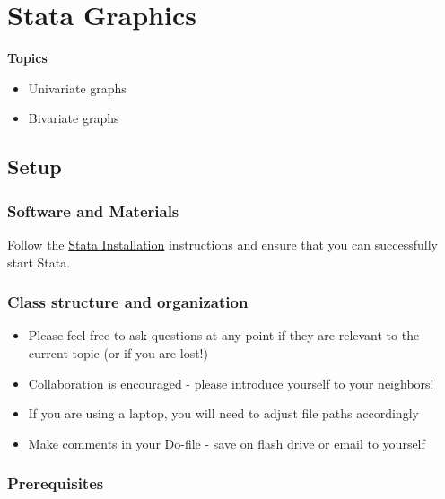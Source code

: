 \documentclass[
]{book}
\providecommand{\tightlist}{%
  \setlength{\itemsep}{0pt}\setlength{\parskip}{0pt}}
\begin{document}
\hypertarget{stata-graphics}{%
\chapter{Stata Graphics}\label{stata-graphics}}

\textbf{Topics}

\begin{itemize}
\tightlist
\item
  Univariate graphs
\item
  Bivariate graphs
\end{itemize}

\hypertarget{setup-9}{%
\section{Setup}\label{setup-9}}

\hypertarget{software-and-materials-9}{%
\subsection{Software and Materials}\label{software-and-materials-9}}

Follow the \href{./StataInstall.html}{Stata Installation} instructions and ensure that you can successfully start Stata.

\hypertarget{class-structure-and-organization-3}{%
\subsection{Class structure and organization}\label{class-structure-and-organization-3}}

\begin{itemize}
\tightlist
\item
  Please feel free to ask questions at any point if they are relevant to the current topic (or if you are lost!)
\item
  Collaboration is encouraged - please introduce yourself to your neighbors!
\item
  If you are using a laptop, you will need to adjust file paths accordingly
\item
  Make comments in your Do-file - save on flash drive or email to yourself
\end{itemize}

\hypertarget{prerequisites-9}{%
\subsection{Prerequisites}\label{prerequisites-9}}
\end{document}

